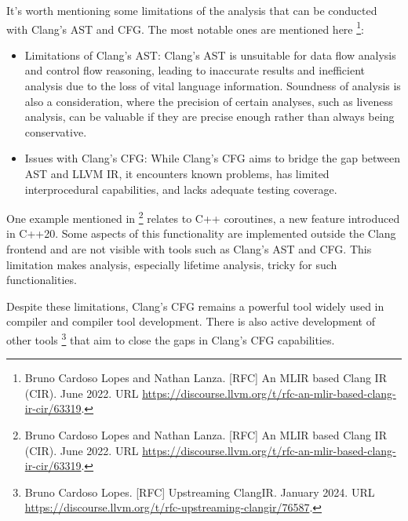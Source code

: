 
It's worth mentioning some limitations of the analysis that can be conducted with Clang's AST and CFG. The most notable ones are mentioned here \footnote{Bruno Cardoso Lopes and Nathan Lanza. [RFC] An MLIR based Clang IR (CIR). June 2022. URL \url{https://discourse.llvm.org/t/rfc-an-mlir-based-clang-ir-cir/63319}.}:


\begin{itemize}
\item
Limitations of Clang's AST: Clang's AST is unsuitable for data flow analysis and control flow reasoning, leading to inaccurate results and inefficient analysis due to the loss of vital language information. Soundness of analysis is also a consideration, where the precision of certain analyses, such as liveness analysis, can be valuable if they are precise enough rather than always being conservative.

\item
Issues with Clang's CFG: While Clang's CFG aims to bridge the gap between AST and LLVM IR, it encounters known problems, has limited interprocedural capabilities, and lacks adequate testing coverage.
\end{itemize}


One example mentioned in \footnote{Bruno Cardoso Lopes and Nathan Lanza. [RFC] An MLIR based Clang IR (CIR). June 2022. URL \url{https://discourse.llvm.org/t/rfc-an-mlir-based-clang-ir-cir/63319}.} relates to C++ coroutines, a new feature introduced in C++20. Some aspects of this functionality are implemented outside the Clang frontend and are not visible with tools such as Clang's AST and CFG. This limitation makes analysis, especially lifetime analysis, tricky for such functionalities.

Despite these limitations, Clang's CFG remains a powerful tool widely used in compiler and compiler tool development. There is also active development of other tools \footnote{Bruno Cardoso Lopes. [RFC] Upstreaming ClangIR. January 2024. URL \url{https://discourse.llvm.org/t/rfc-upstreaming-clangir/76587}.} that aim to close the gaps in Clang's CFG capabilities.
